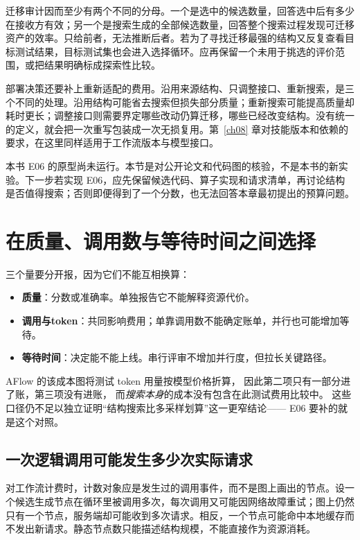 迁移审计因而至少有两个不同的分母。一个是选中的候选数量，回答选中后有多少在接收方有效；另一个是搜索生成的全部候选数量，回答整个搜索过程发现可迁移资产的效率。只给前者，无法推断后者。若为了寻找迁移最强的结构又反复查看目标测试结果，目标测试集也会进入选择循环。应再保留一个未用于挑选的评价范围，或把结果明确标成探索性比较。

部署决策还要补上重新适配的费用。沿用来源结构、只调整接口、重新搜索，是三个不同的处理。沿用结构可能省去搜索但损失部分质量；重新搜索可能提高质量却耗时更长；调整接口则需要界定哪些改动仍算迁移，哪些已经改变结构。没有统一的定义，就会把一次重写包装成一次无损复用。第~\ref{ch08} 章对技能版本和依赖的要求，在这里同样适用于工作流版本与模型接口。

本书 E06 的原型尚未运行。本节是对公开论文和代码图的核验，不是本书的新实验。下一步若实现 E06，应先保留候选代码、算子实现和请求清单，再讨论结构是否值得搜索；否则即便得到了一个分数，也无法回答本章最初提出的预算问题。

\section{在质量、调用数与等待时间之间选择}
\label{sec:ch09-tradeoff}

三个量要分开报，因为它们不能互相换算：
\begin{itemize}
  \item \textbf{质量}：分数或准确率。单独报告它不能解释资源代价。
  \item \textbf{调用与token}：共同影响费用；单靠调用数不能确定账单，并行也可能增加等待。
  \item \textbf{等待时间}：决定能不能上线。串行评审不增加并行度，但拉长关键路径。
\end{itemize}

AFlow 的该成本图将测试 token 用量按模型价格折算\cite{aflow-2410}，
因此第二项只有一部分进了账，第三项没有进账，
而\emph{搜索本身}的成本没有包含在此测试费用比较中。
这些口径仍不足以独立证明``结构搜索比多采样划算''这一更窄结论——
E06 要补的就是这个对照。

\subsection{一次逻辑调用可能发生多少次实际请求}
\label{sec:ch09-occurrences}

对工作流计费时，计数对象应是发生过的调用事件，而不是图上画出的节点。设一个候选生成节点在循环里被调用多次，每次调用又可能因网络故障重试；图上仍然只有一个节点，服务端却可能收到多次请求。相反，一个节点可能命中本地缓存而不发出新请求。静态节点数只能描述结构规模，不能直接作为资源消耗。


